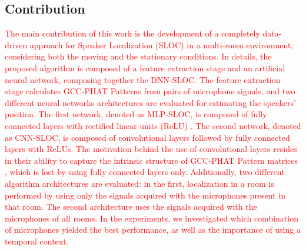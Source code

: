 \documentclass[review]{elsarticle}
\begin{document}
\subsection{Contribution}
\textcolor{red}{
The main contribution of this work is the development of a completely data-driven approach for Speaker Localization (SLOC) in a multi-room environment, considering both the moving and the stationary conditions. %
In details, the proposed algorithm is composed of a feature extraction stage and an artificial neural network, composing together the DNN-SLOC. %
The feature extraction stage calculates GCC-PHAT Patterns \cite{xiao2015learning} from pairs of microphone signals, and two different neural networks architectures are evaluated for estimating the speakers' position. The first network, denoted as MLP-SLOC, is composed of fully connected layers with rectified linear units (ReLU) \cite{nair2010rectified}. The second network, denoted as CNN-SLOC, is composed of convolutional layers followed by fully connected layers with ReLUs. The motivation behind the use of convolutional layers resides in their ability to capture the intrinsic structure of GCC-PHAT Pattern matrices \cite{xiao2015learning}, which is lost by using fully connected layers only. Additionally, two different algorithm architectures are evaluated: in the first, localization in a room is performed by using only the signals acquired with the microphones present in that room. The second architecture uses the signals acquired with the microphones of all rooms. In the experiments, we investigated which combination of microphones yielded the best performance, as well as the importance of using a temporal context.
}

\end{document}
